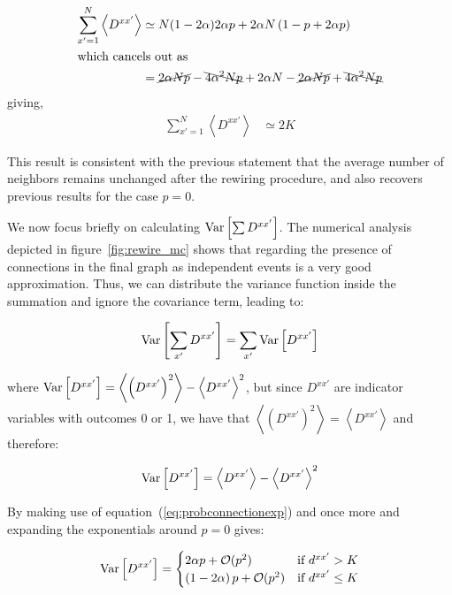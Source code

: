 \begin{align*}
  \sum_{x'=1}^N \left< D^{xx'} \right> &\simeq N(1-2\alpha)2\alpha p + 2\alpha N\left( 1 - p + 2\alpha p \right) \\
	\intertext{\noindent which cancels out as}
  &= \cancel{2\alpha Np} - \bcancel{4\alpha^2Np} + 2\alpha N - \cancel{2\alpha Np} + \bcancel{4\alpha^2Np}
\end{align*}
\noindent giving,
\begin{align}
  \sum_{x'=1}^N \left< D^{xx'} \right> &\simeq 2K
\end{align}

This result is consistent with the previous statement that the average
number of neighbors remains unchanged after the rewiring procedure, and also recovers previous results\cite{escaff2014arrays} for the
case $p=0$.

We now focus briefly on calculating $\text{Var}\left[{\sum D^{xx'}}\right]$. The numerical analysis depicted in figure~\ref{fig:rewire_mc} shows that
regarding the presence of connections in the final graph as independent events is a very good approximation. Thus, we can distribute
the variance function inside the summation and ignore the covariance term, leading to:

\begin{equation}
  \text{Var}\left[{\sum_{x'}D^{xx'}}\right] = \sum_{x'} \text{Var}\left[{D^{xx'}}\right]
\end{equation}

\noindent where $\text{Var}\left[{D^{xx'}}\right] = \left< \left( D^{xx'} \right)^2 \right> - \left< D^{xx'} \right>^2$, but since $D^{xx'}$ are indicator
variables with outcomes 0 or 1, we have that $\left< \left( D^{xx'} \right)^2 \right> = \left< D^{xx'} \right>$ and therefore:

\begin{equation}
  \text{Var}\left[{D^{xx'}}\right] = \left< D^{xx'} \right> - \left< D^{xx'} \right>^2
\end{equation}

By making use of equation~(\ref{eq:probconnectionexp}) and once more and expanding the exponentials around $p=0$ gives:

\begin{equation}
  \text{Var}\left[{D^{xx'}}\right] =
  \begin{cases}
    2\alpha p + \mathcal{O}(p^2) & \text{if $d^{xx'} > K$} \\
    \left( 1-2\alpha \right)p + \mathcal{O}(p^2) & \text{if $d^{xx'} \leq K$}
  \end{cases}
\end{equation}

